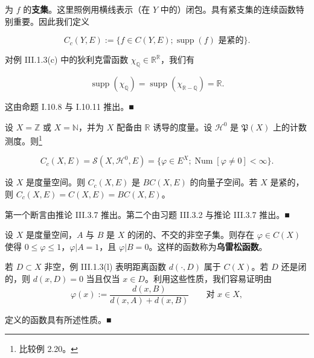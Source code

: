 为 $ f $ 的\textbf{支集}。这里照例用横线表示（在 $ Y $ 中的）闭包。具有紧支集的连续函数特别重要。因此我们定义

\[
C_c(Y, E) := \{ f \in C(Y, E) ; \operatorname{supp}(f) \text{ 是紧的} \} .
\]

\begin{example}

\begin{items}
\item

对例 III.1.3(c) 中的狄利克雷函数 $ \chi_{\mathbb{Q}} \in \mathbb{R}^{\mathbb{R}} $，我们有

\[
\operatorname{supp}(\chi_{\mathbb{Q}}) = \operatorname{supp}(\chi_{\mathbb{R}-\mathbb{Q}}) = \mathbb{R} .
\]

\proofhead
这由命题 I.10.8 与 I.10.11 推出。\nobreak\hspace{0.35em}■
\item

设 $ X = \mathbb{Z} $ 或 $ X = \mathbb{N} $，并为 $ X $ 配备由 $ \mathbb{R} $ 诱导的度量。设 $ \mathcal{H}^0 $ 是 $ \mathfrak{P}(X) $ 上的计数测度。则\footnote{比较例 2.20。}

\[
C_c(X, E) = \mathcal{S}(X, \mathcal{H}^0, E) = \{ \varphi \in E^X ; \operatorname{Num}[\varphi \ne 0] < \infty \} .
\]
\item

设 $ X $ 是度量空间。则 $ C_c(X, E) $ 是 $ BC(X, E) $ 的向量子空间。若 $ X $ 是紧的，则 $ C_c(X, E) = C(X, E) = BC(X, E) $。

\proofhead
第一个断言由推论 III.3.7 推出。第二个由习题 III.3.2 与推论 III.3.7 推出。\nobreak\hspace{0.35em}■
\end{items}

\end{example}

\begin{proposition}

设 $ X $ 是度量空间，$ A $ 与 $ B $ 是 $ X $ 的闭的、不交的非空子集。则存在 $ \varphi \in C(X) $ 使得 $ 0 \le \varphi \le 1 $，$ \varphi|A = 1 $，且 $ \varphi|B = 0 $。这样的函数称为\textbf{乌雷松函数}。

\proofhead
若 $ D \subset X $ 非空，例 III.1.3(l) 表明距离函数 $ d(\cdot, D) $ 属于 $ C(X) $。若 $ D $ 还是闭的，则 $ d(x, D) = 0 $ 当且仅当 $ x \in D $。利用这些性质，我们容易证明由
\[
\varphi(x) := \frac{d(x, B)}{d(x, A) + d(x, B)} \qquad \text{对 } x \in X ,
\]

定义的函数具有所述性质。\nobreak\hspace{0.35em}■

\end{proposition}

